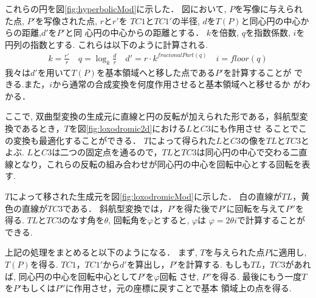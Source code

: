 これらの円を図\ref{fig:hyperbolicMod}に示した．
図において, $P$を写像に与えられた点, $P'$を写像された点, $r$と$r'$を
$TC1$と$TC1'$の半径, $d$を$T(P)$と同心円の中心からの距離,$d'$を$P'$と同
心円の中心からの距離とする．
$k$を倍数, $q$を指数係数, $i$を円列の指数とする.
これらは以下のように計算される.
 \begin{align*}
  k = \frac{r'}{r} \quad
  q = \log_{k} \frac{d}{r} \quad
  d' = r \cdot k^{fracionalPart(q)} \quad
  i = floor(q)
 \end{align*}
我々は$d'$を用いて$T(P)$を基本領域へと移した点である$P'$を計算することが
できる.また，$i$から通常の合成変換を何度作用させると基本領域へと移せるか
がわかる．

ここで, 双曲型変換の生成元に直線と円の反転が加えられた形である，斜航型変
換であるとき，$T$を図\ref{fig:loxodromic2d}における$L$と$C3$にも作用させ
ることでこの変換も最適化することができる．
$T$によって得られた$L$と$C3$の像を$TL$と$TC3$とよぶ.
$L$と$C3$は二つの固定点を通るので，$TL$と$TC3$は同心円の中心で交わる二直
線となり，これらの反転の組み合わせが同心円の中心を回転中心とする回転を表
す.

$T$によって移された生成元を図\ref{fig:loxodromicMod}に示した．
白の直線が$TL$，黄色の直線が$TC3$である．
斜航型変換では，$P'$を得た後で$P'$に回転を与えて$P''$を得る.
$TL$と$TC3$のなす角を$\theta$, 回転角を$\varphi$とすると, $\varphi$は
$\varphi = 2 \theta i$で計算することができる.

上記の処理をまとめると以下のようになる．
まず, $T$を与えられた点$P$に適用し, $T(P)$を得る.
$TC1$，$TC1'$から$d'$を算出し，$P'$を計算する.
もしも$TL$，$TC3$があれば, 同心円の中心を回転中心として$P'$を$\varphi$回転
させ, $P''$を得る.
最後にもう一度$T$を$P'$もしくは$P''$に作用させ，元の座標に戻すことで基本
領域上の点を得る.

